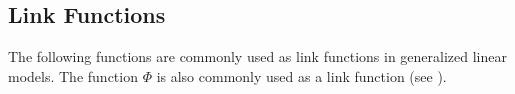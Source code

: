 \begin{description}
\begin{description}
\begin{description}
\begin{description}
\begin{description}
\begin{description}
\begin{description}
\begin{description}
\begin{description}
\begin{description}
\begin{description}
\begin{description}
\begin{description}
\begin{description}
\begin{description}
\begin{description}
\begin{description}
\begin{description}
\begin{description}
\begin{description}   %



\section{Link Functions}

The following functions are commonly used as link functions in generalized linear models.  The function $\Phi$ is also commonly used as a link function (see ).


\end{description}
\end{description}
\end{description}
\end{description}
\end{description}
\end{description}
\end{description}
\end{description}
\end{description}
\end{description}
\end{description}
\end{description}
\end{description}
\end{description}
\end{description}
\end{description}
\end{description}
\end{description}
\end{description}
\end{description}
